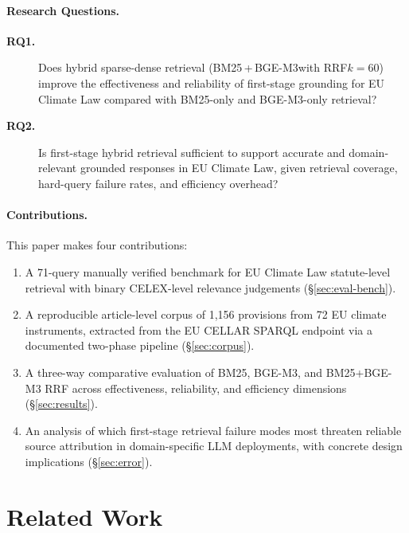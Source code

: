 \documentclass{iosart2x}
\newcommand{\bgem}{BGE-M3\xspace}
\newcommand{\rrf}{RRF\xspace}
\begin{document}
\paragraph{Research Questions.}

\begin{description}
  \item[\textbf{RQ1.}] Does hybrid sparse-dense retrieval
    (BM25\,+\,\bgem{}with \rrf $k{=}60$) improve the effectiveness and
    reliability of first-stage grounding for EU Climate Law compared
    with BM25-only and \bgem-only retrieval?
  \item[\textbf{RQ2.}] Is first-stage hybrid retrieval sufficient to
    support accurate and domain-relevant grounded responses in EU
    Climate Law, given retrieval coverage, hard-query failure rates,
    and efficiency overhead?
\end{description}

\paragraph{Contributions.}  This paper makes four contributions:

\begin{enumerate}
  \item A 71-query manually verified benchmark for EU Climate Law
    statute-level retrieval with binary CELEX-level relevance
    judgements (\S\ref{sec:eval-bench}).
  \item A reproducible article-level corpus of 1,156 provisions from
    72 EU climate instruments, extracted from the EU CELLAR SPARQL
    endpoint via a documented two-phase pipeline
    (\S\ref{sec:corpus}).
  \item A three-way comparative evaluation of BM25, \bgem{}, and
    BM25+\bgem{} \rrf across effectiveness, reliability, and
    efficiency dimensions (\S\ref{sec:results}).
  \item An analysis of which first-stage retrieval failure modes most
    threaten reliable source attribution in domain-specific LLM
    deployments, with concrete design implications
    (\S\ref{sec:error}).
\end{enumerate}

\section{Related Work}
\label{sec:related}
\end{document}
